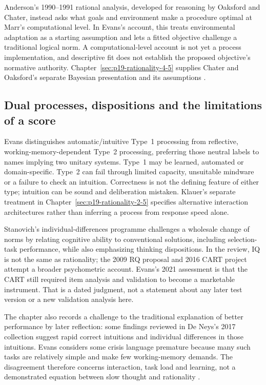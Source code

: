 Anderson's 1990--1991 rational analysis, developed for reasoning by Oaksford
and Chater, instead asks what goals and environment make a procedure optimal
at Marr's computational level.  In Evans's account, this treats environmental
adaptation as a starting assumption and lets a fitted objective challenge a
traditional logical norm.  A computational-level account is not yet a process
implementation, and descriptive fit does not establish the proposed objective's
normative authority.  Chapter~\ref{sec:p19-rationality-4-5} supplies Chater
and Oaksford's separate Bayesian presentation and its assumptions
\parencite[pp.~93--94]{Evans2021RationalityDebate}.

\subsection{Dual processes, dispositions and the limitations of a score}

Evans distinguishes automatic/intuitive Type~1 processing from reflective,
working-memory-dependent Type~2 processing, preferring those neutral labels
to names implying two unitary systems.  Type~1 may be learned, automated or
domain-specific.  Type~2 can fail through limited capacity, unsuitable
mindware or a failure to check an intuition.  Correctness is not the defining
feature of either type; intuition can be sound and deliberation mistaken.
Klauer's separate treatment in Chapter~\ref{sec:p19-rationality-2-5}
specifies alternative interaction architectures rather than inferring a
process from response speed alone.

Stanovich's individual-differences programme challenges a wholesale change
of norms by relating cognitive ability to conventional solutions, including
selection-task performance, while also emphasizing thinking dispositions.
In the review, IQ is not the same as rationality; the 2009 RQ proposal and
2016 CART project attempt a broader psychometric account.  Evans's 2021
assessment is that the CART still required item analysis and validation to
become a marketable instrument.  That is a dated judgment, not a statement
about any later test version or a new validation analysis here.

The chapter also records a challenge to the traditional explanation of
better performance by later reflection: some findings reviewed in De Neys's
2017 collection suggest rapid correct intuitions and individual differences
in those intuitions.  Evans considers some crisis language premature because
many such tasks are relatively simple and make few working-memory demands.
The disagreement therefore concerns interaction, task load and learning,
not a demonstrated equation between slow thought and rationality
\parencite[pp.~94--95]{Evans2021RationalityDebate}.

